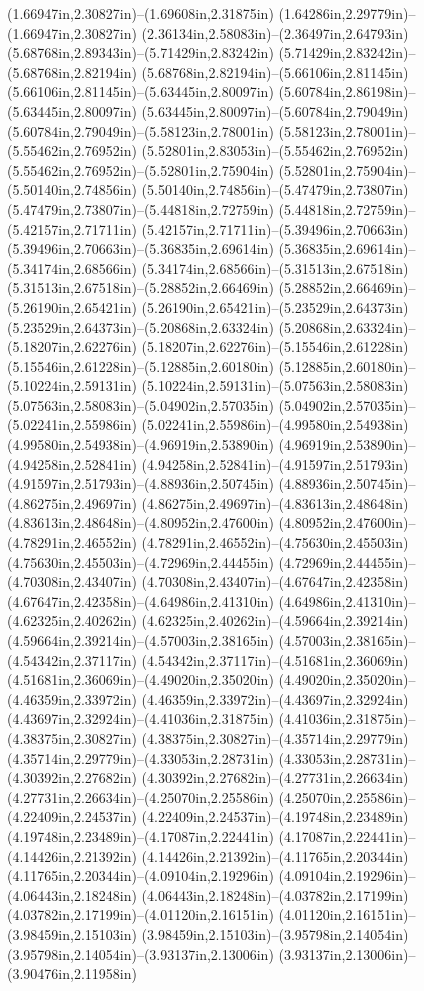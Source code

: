 (1.66947in,2.30827in)--(1.69608in,2.31875in) (1.64286in,2.29779in)--(1.66947in,2.30827in) (2.36134in,2.58083in)--(2.36497in,2.64793in) (5.68768in,2.89343in)--(5.71429in,2.83242in) (5.71429in,2.83242in)--(5.68768in,2.82194in) (5.68768in,2.82194in)--(5.66106in,2.81145in) (5.66106in,2.81145in)--(5.63445in,2.80097in) (5.60784in,2.86198in)--(5.63445in,2.80097in) (5.63445in,2.80097in)--(5.60784in,2.79049in) (5.60784in,2.79049in)--(5.58123in,2.78001in) (5.58123in,2.78001in)--(5.55462in,2.76952in) (5.52801in,2.83053in)--(5.55462in,2.76952in) (5.55462in,2.76952in)--(5.52801in,2.75904in) (5.52801in,2.75904in)--(5.50140in,2.74856in) (5.50140in,2.74856in)--(5.47479in,2.73807in) (5.47479in,2.73807in)--(5.44818in,2.72759in) (5.44818in,2.72759in)--(5.42157in,2.71711in) (5.42157in,2.71711in)--(5.39496in,2.70663in) (5.39496in,2.70663in)--(5.36835in,2.69614in) (5.36835in,2.69614in)--(5.34174in,2.68566in) (5.34174in,2.68566in)--(5.31513in,2.67518in) (5.31513in,2.67518in)--(5.28852in,2.66469in) (5.28852in,2.66469in)--(5.26190in,2.65421in) (5.26190in,2.65421in)--(5.23529in,2.64373in) (5.23529in,2.64373in)--(5.20868in,2.63324in) (5.20868in,2.63324in)--(5.18207in,2.62276in) (5.18207in,2.62276in)--(5.15546in,2.61228in) (5.15546in,2.61228in)--(5.12885in,2.60180in) (5.12885in,2.60180in)--(5.10224in,2.59131in) (5.10224in,2.59131in)--(5.07563in,2.58083in) (5.07563in,2.58083in)--(5.04902in,2.57035in) (5.04902in,2.57035in)--(5.02241in,2.55986in) (5.02241in,2.55986in)--(4.99580in,2.54938in) (4.99580in,2.54938in)--(4.96919in,2.53890in) (4.96919in,2.53890in)--(4.94258in,2.52841in) (4.94258in,2.52841in)--(4.91597in,2.51793in) (4.91597in,2.51793in)--(4.88936in,2.50745in) (4.88936in,2.50745in)--(4.86275in,2.49697in) (4.86275in,2.49697in)--(4.83613in,2.48648in) (4.83613in,2.48648in)--(4.80952in,2.47600in) (4.80952in,2.47600in)--(4.78291in,2.46552in) (4.78291in,2.46552in)--(4.75630in,2.45503in) (4.75630in,2.45503in)--(4.72969in,2.44455in) (4.72969in,2.44455in)--(4.70308in,2.43407in) (4.70308in,2.43407in)--(4.67647in,2.42358in) (4.67647in,2.42358in)--(4.64986in,2.41310in) (4.64986in,2.41310in)--(4.62325in,2.40262in) (4.62325in,2.40262in)--(4.59664in,2.39214in) (4.59664in,2.39214in)--(4.57003in,2.38165in) (4.57003in,2.38165in)--(4.54342in,2.37117in) (4.54342in,2.37117in)--(4.51681in,2.36069in) (4.51681in,2.36069in)--(4.49020in,2.35020in) (4.49020in,2.35020in)--(4.46359in,2.33972in) (4.46359in,2.33972in)--(4.43697in,2.32924in) (4.43697in,2.32924in)--(4.41036in,2.31875in) (4.41036in,2.31875in)--(4.38375in,2.30827in) (4.38375in,2.30827in)--(4.35714in,2.29779in) (4.35714in,2.29779in)--(4.33053in,2.28731in) (4.33053in,2.28731in)--(4.30392in,2.27682in) (4.30392in,2.27682in)--(4.27731in,2.26634in) (4.27731in,2.26634in)--(4.25070in,2.25586in) (4.25070in,2.25586in)--(4.22409in,2.24537in) (4.22409in,2.24537in)--(4.19748in,2.23489in) (4.19748in,2.23489in)--(4.17087in,2.22441in) (4.17087in,2.22441in)--(4.14426in,2.21392in) (4.14426in,2.21392in)--(4.11765in,2.20344in) (4.11765in,2.20344in)--(4.09104in,2.19296in) (4.09104in,2.19296in)--(4.06443in,2.18248in) (4.06443in,2.18248in)--(4.03782in,2.17199in) (4.03782in,2.17199in)--(4.01120in,2.16151in) (4.01120in,2.16151in)--(3.98459in,2.15103in) (3.98459in,2.15103in)--(3.95798in,2.14054in) (3.95798in,2.14054in)--(3.93137in,2.13006in) (3.93137in,2.13006in)--(3.90476in,2.11958in) 